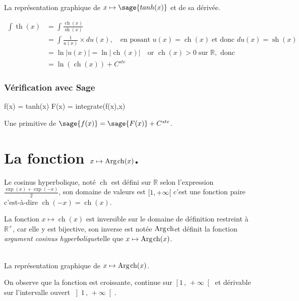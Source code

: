 \documentclass[a4paper,landscape,17pt]{extreport} %
\def\eclaire{\mathbb}
\def\R{\ensuremath{\eclaire R}}
\renewcommand{\sinh}{\mathop{\mathrm{sh}}}
\renewcommand{\cosh}{\mathop{\mathrm{ch}}}
\renewcommand{\tanh}{\mathop{\mathrm{th}}}
\renewcommand{\arg}{\mathop{\mathrm{Arg}}}
\begin{document}
\begin{center}
 \\
La représentation graphique de $x \mapsto \sage{tanh(x)} $ et de sa dérivée.
\end{center}


\begin{align*}
\int \tanh(x) & = \int \frac{\cosh(x)}{\sinh(x)} \\
&  =  \int \frac{1}{u(x)} \times du(x), \quad \textrm{en posant } u(x) =  \cosh(x) \; \textrm{et donc } du(x) = \sinh(x) \\
&  =  \ln|u(x)| = \ln|\cosh(x)|  \quad \textrm{or } \cosh(x)>0 \; \textrm{sur } \R ,  \textrm{ donc}\\
&  =   \ln\left(\cosh(x)\right) + C^{ste} 
\end{align*}


\subsubsection{Vérification avec Sage}


\begin{sageblock}
    f(x) = tanh(x)
    F(x) = integrate(f(x),x)
\end{sageblock}

Une primitive de $\sage{f(x)} = \sage{F(x)} + C^{ste}$.




\section{La fonction  $x \mapsto \arg\mspace{-1mu}\cosh(x)$.}

Le cosinus hyperbolique, noté $\cosh$ est défini sur $\R$ selon l'expression $\frac{\exp(x)+\exp(-x)}{2}$, son domaine de valeurs est $[1, +\infty [$ 
c'est une fonction paire c'est-à-dire $\cosh(-x)=\cosh(x)$.


La fonction $x \mapsto \cosh(x)$ est inversible sur le domaine de définition restreint à $\R^+$, car elle y est bijective, son inverse est notée \og $ \arg\mspace{-1mu}\cosh $\fg et définit la fonction \og\emph{argument cosinus hyperbolique}\fg telle que $x \mapsto \arg\mspace{-1mu}\cosh(x)$.


\begin{center}
 \\
La représentation graphique de $x \mapsto \arg\mspace{-1mu}\cosh(x)$.
\end{center}
On observe que la fonction est croissante, continue sur $\left[1\,,\,+\infty \right[ $ et dérivable sur l'intervalle ouvert $\left]1\,,\,+\infty \right[ $.
                                                                                               
\end{document}
